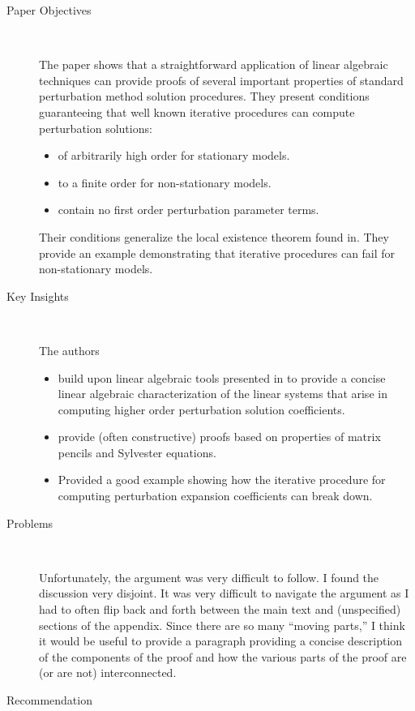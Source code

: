 \documentclass{article}
\begin{document}
\begin{description}
\item[Paper Objectives]\ 

 The paper shows that a straightforward application of
linear algebraic techniques can provide proofs of several important properties
of standard perturbation method solution procedures.
They present 
conditions guaranteeing that well known iterative procedures can compute perturbation solutions:
  \begin{itemize}
  \item of arbitrarily high order for stationary models.
  \item to a finite order for non-stationary models.
  \item contain no first order perturbation parameter terms.
\end{itemize}
Their conditions generalize the local existence theorem found in\cite{jin02}.
They provide an example demonstrating that iterative procedures can fail for
non-stationary models.

\item[Key Insights] \ 

The authors 

\begin{itemize}
\item build upon linear algebraic tools presented in\cite{vetter1973} to provide
a concise linear algebraic characterization of the linear systems that
arise in computing higher order perturbation solution coefficients.
\item provide (often constructive) proofs based on properties of 
matrix pencils and Sylvester equations.
\item Provided a good example showing how the iterative procedure for computing
perturbation expansion coefficients can break down.
\end{itemize}

\item[Problems] \ 

Unfortunately, the argument was very difficult to follow. I found the discussion
very disjoint.  It was very difficult to navigate the argument as I had to
often flip back and forth between the main text and (unspecified) sections
of the appendix. 
Since there are so many ``moving parts,'' I think
 it would be useful to provide a paragraph
providing a  concise description of the components of the proof and  how the
various  parts of the proof are (or are not) interconnected.

\item[Recommendation] \ 


\end{description}
\end{document}
